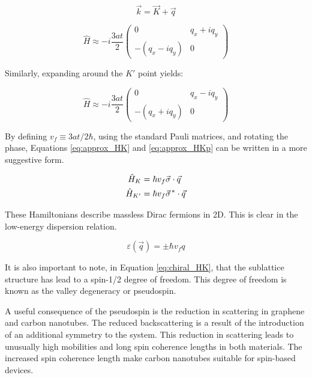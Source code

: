 \begin{equation}
    \vec{k} = \vec{K} + \vec{q}
\end{equation}

\begin{equation}
\label{eq:approx_HK}
    \hat{H} \approx -i\frac{3at}{2} \begin{pmatrix} 0 & q_x+iq_y\\ -(q_x-iq_y)& 0 \end{pmatrix}
\end{equation}

Similarly, expanding around the $K'$ point yields:

\begin{equation}
\label{eq:approx_HKp}
    \hat{H} \approx -i\frac{3at}{2} \begin{pmatrix} 0 & q_x-iq_y\\ -(q_x+iq_y)& 0 \end{pmatrix}
\end{equation}

By defining $v_f \equiv {3at}/{2\hbar}$, using the standard Pauli matrices, and rotating the phase, Equations \ref{eq:approx_HK} and \ref{eq:approx_HKp} can be written in a more suggestive form. 

\begin{align}
    \hat{H}_K &= \hbar v_f \vec{\sigma}\cdot\vec{q} \label{eq:chiral_HK} \\
    \hat{H}_{K'} &= \hbar v_f \pvec{\sigma}^*\cdot\vec{q} \nonumber
\end{align}

These Hamiltonians describe massless Dirac fermions in 2D. This is clear in the low-energy dispersion relation.

\begin{equation}
\label{eq:massless_disp}
    \varepsilon(\vec{q}) = \pm\hbar v_f q
\end{equation}

It is also important to note, in Equation \ref{eq:chiral_HK}, that the sublattice structure has lead to a spin-1/2 degree of freedom. This degree of freedom is known as the valley degeneracy or pseudospin. 

A useful consequence of the pseudospin is the reduction in scattering in graphene and carbon nanotubes. The reduced backscattering is a result of the introduction of an additional symmetry to the system. This reduction in scattering leads to unusually high mobilities and long spin coherence lengths in both materials. The increased spin coherence length make carbon nanotubes suitable for spin-based devices.


